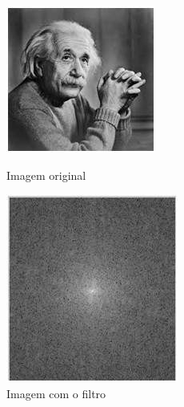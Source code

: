 \documentclass[a4paper, 12pt]{article}
\begin{document}
\begin{figure}[!htb]
	\centering
	  \includegraphics[width=\linewidth]{images/einstein256.jpg}
	  \caption{Imagem original}
	\endminipage\hspace{1cm}
	  \includegraphics[width=\linewidth]{images/freq.jpg}
	  \caption{Imagem com o filtro}
	\endminipage
\end{figure}
\end{document}
